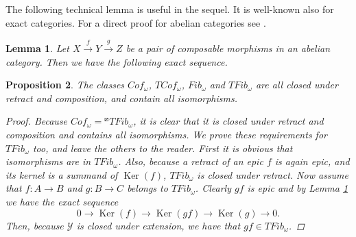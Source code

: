 \documentclass[12pt]{amsart}
\numberwithin{equation}{section}
\newtheorem{lemma}{Lemma}[section]
\newtheorem{proposition}[lemma]{Proposition}
\theoremstyle{definition}
\DeclareMathOperator{\Ker}{Ker}
\DeclareMathOperator{\Cok}{Cok}
\newtheorem*{theorem 0*}{Theorem}
\newtheorem*{theorem a*}{Theorem A}
\newtheorem*{theorem b*}{Theorem B}
\numberwithin{diagram}{section}
\begin{document}
The following technical lemma is useful in the sequel. It is well-known also for exact categories. For a direct proof for abelian categories see \cite[Lemma 2.8]{E25}.
\begin{lemma}\label{3.9}
 Let $X\overset{f}{\rightarrow}Y\overset{g}{\rightarrow}Z$ be a pair of composable morphisms in an abelian category. Then we have the following exact sequence.
\begin{center}
\end{center}
\end{lemma}
\begin{proposition}\label{3.10}
The classes $Cof_{\omega}$, $TCof_{\omega}$, $Fib_{\omega}$ and $TFib_{\omega}$ are all closed under retract and composition, and contain all isomorphisms.
\begin{proof}
Because $Cof_{\omega}={}^{\boxslash}TFib_{\omega}$, it is clear that it is closed under retract and composition and contains all isomorphisms.
We prove these requirements for $TFib_{\omega}$ too, and leave the others to the reader.
First it is obvious that isomorphisms are in $TFib_{\omega}$. Also, because a retract of an epic $f$ is again epic, and its kernel is a summand of $\Ker(f)$, $TFib_{\omega}$ is closed under retract. Now assume that $f:A\rightarrow B$ and $g:B\rightarrow C$ belongs to $TFib_{\omega}$. Clearly $gf$ is epic and by Lemma \ref{3.9} we have the exact sequence
\[0\rightarrow \Ker(f)\rightarrow \Ker(gf)\rightarrow\Ker(g)\rightarrow 0.\]
Then, because $\mathcal{Y}$ is closed under extension, we have that $gf\in TFib_{\omega}$.
\end{proof}
\end{proposition}
\end{document}
